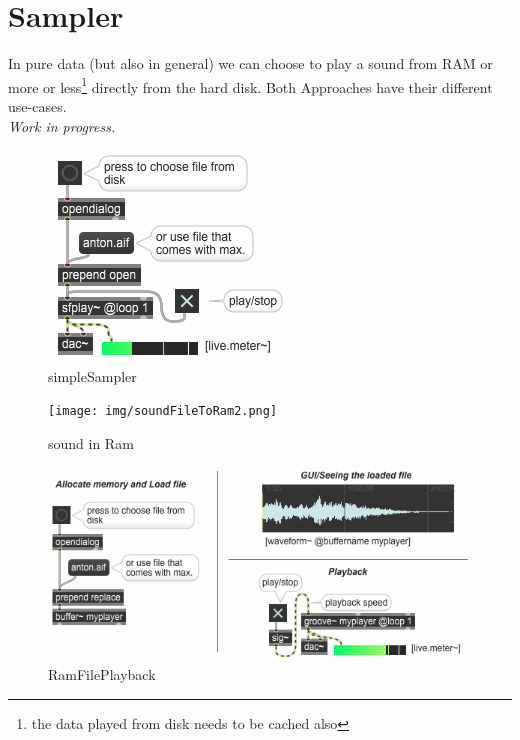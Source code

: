 \section{Sampler}
In pure data (but also in general) we can choose to play a sound from RAM or more or less\footnote{the data played from disk needs to be cached also} directly from the hard disk. Both Approaches have their different use-cases.\\


\textit{Work in progress.}

\begin{figure}[H]
	\begin{center}
		\includegraphics[scale = 1]{img/sampler.png}
		\caption{simpleSampler}
		\label{fig:simpleSampler}
	\end{center}
\end{figure}

\begin{figure}[H]
	\begin{center}
		\texttt{[image: img/soundFileToRam2.png]}
		\caption{sound in Ram}
		\label{fig:soundRam}
	\end{center}
\end{figure}


\begin{figure}[H]
	\begin{center}
		\includegraphics[scale = 1]{img/RamFilePlayback.png}
		\caption{RamFilePlayback}
		\label{fig:RamFilePlayback}
	\end{center}
\end{figure}



